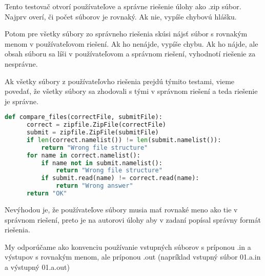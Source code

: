 Tento testovač otvorí používateľove a správne riešenie úlohy ako .zip súbor.
Najprv overí, či počet súborov je rovnaký. Ak nie, vypíše chybovú hlášku.

Potom pre všetky súbory zo správneho riešenia skúsi nájsť súbor s rovnakým menom
v používateľovom riešení. Ak ho nenájde, vypíše chybu. Ak ho nájde, ale obsah súboru sa líši v
používateľovom a správnom riešení, vyhodnotí riešenie za nesprávne.

Ak všetky súbory z používateľovho riešenia prejdú týmito testami, vieme povedať,
že všetky súbory sa zhodovali s tými v správnom riešení a teda riešenie je správne.
\begin{lstlisting}[language=Python]
  def compare_files(correctFile, submitFile):
      correct = zipfile.ZipFile(correctFile)
      submit = zipfile.ZipFile(submitFile)
      if len(correct.namelist()) != len(submit.namelist()):
          return "Wrong file structure"
      for name in correct.namelist():
          if name not in submit.namelist():
              return "Wrong file structure"
          if submit.read(name) != correct.read(name):
              return "Wrong answer"
      return "OK"
\end{lstlisting}

Nevýhodou je, že používateľove súbory musia mať rovnaké meno ako tie v správnom riešení,
preto je na autorovi úlohy aby v zadaní popísal správny formát riešenia.

My odporúčame ako konvenciu používanie vstupných súborov s príponou .in a výstupov
s rovnakým menom, ale príponou .out (napríklad vstupný súbor 01.a.in a výstupný 01.a.out)
